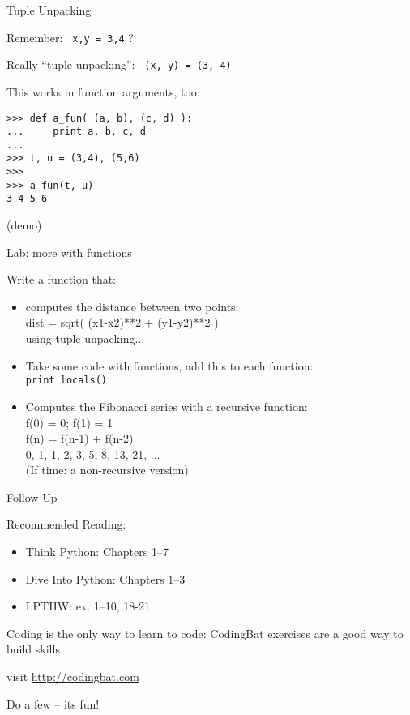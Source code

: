 \documentclass{beamer}
\begin{document}
\begin{frame}[fragile]{Tuple Unpacking}

{\Large Remember: \verb| x,y = 3,4| ?}

\vfill
{\Large Really ``tuple unpacking'': \verb| (x, y) = (3, 4)|}

\vfill
{\Large This works in function arguments, too:}

\begin{verbatim}
>>> def a_fun( (a, b), (c, d) ):
...     print a, b, c, d
... 
>>> t, u = (3,4), (5,6)
>>> 
>>> a_fun(t, u)
3 4 5 6
\end{verbatim}
(demo)
\end{frame}

\begin{frame}[fragile]{Lab: more with functions}

{\Large Write a function that:}
\begin{itemize}
  \item computes the distance between two points:\\
        dist = sqrt( (x1-x2)**2 + (y1-y2)**2 )\\
        using tuple unpacking...
  \item Take some code with functions, add this to each function:\\
        \verb|print locals()|
  \item Computes the Fibonacci series with a recursive function:\\
  f(0) = 0; f(1) = 1\\
  f(n) = f(n-1) + f(n-2)\\
  0, 1, 1, 2, 3, 5, 8, 13, 21, ...\\
  (If time: a non-recursive version)
\end{itemize}

\end{frame}


\begin{frame}[fragile]{Follow Up}

Recommended Reading:
\begin{itemize}
  \item Think Python: Chapters 1--7 \\
  \item Dive Into Python: Chapters 1--3 \\
  \item LPTHW: ex. 1--10, 18-21 \\
\end{itemize}


\vfill
Coding is the only way to learn to code: 
CodingBat exercises are a good way to build skills.

visit \url{http://codingbat.com}

Do a few -- its fun!

\end{frame}
\end{document}
